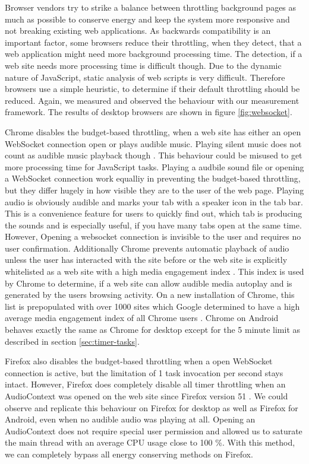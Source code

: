 \documentclass[
	ruledheaders=section,%
	class=report,%
	thesis={type=bachelor},%
	accentcolor=9c,%
	custommargins=true,%
	marginpar=false,%
	parskip=half-,%
	fontsize=11pt,%
]{tudapub}
\begin{document}
  Browser vendors try to strike a balance between throttling background pages as much as possible to conserve energy and keep the system more responsive and not breaking existing web applications. As backwards compatibility is an important factor, some browsers reduce their throttling, when they detect, that a web application might need more background processing time. The detection, if a web site needs more processing time is difficult though. Due to the dynamic nature of JavaScript, static analysis of web scripts is very difficult. Therefore browsers use a simple heuristic, to determine if their default throttling should be reduced. Again, we measured and observed the behaviour with our measurement framework. The results of desktop browsers are shown in figure \ref{fig:websocket}.

  Chrome disables the budget-based throttling, when a web site has either an open WebSocket connection open or plays audible music. Playing silent music does not count as audible music playback though \cite{chrome-background-tabs}. This behaviour could be misused to get more processing time for JavaScript tasks. Playing a audbile sound file or opening a WebSocket connection work equalliy in preventing the budget-based throttling, but they differ hugely in how visible they are to the user of the web page. Playing audio is obviously audible and marks your tab with a speaker icon in the tab bar. This is a convenience feature for users to quickly find out, which tab is producing the sounds and is especially useful, if you have many tabs open at the same time. However, Opening a websocket connection is invisible to the user and requires no user confirmation. Additionally Chrome prevents automatic playback of audio unless the user has interacted with the site before or the web site is explicitly whitelisted as a web site with a high media engagement index \cite{chrome-media-engagement-index}. This index is used by Chrome to determine, if a web site can allow audible media autoplay and is generated by the users browsing activity. On a new installation of Chrome, this list is prepopulated with over 1000 sites which Google determined to have a high average media engagement index of all Chrome users \cite{chrome-autoplay}. Chrome on Android behaves exactly the same as Chrome for desktop except for the 5 minute limit as described in section \ref{sec:timer-tasks}.

  Firefox also disables the budget-based throttling when a open WebSocket connection is active, but the limitation of 1 task invocation per second stays intact. However, Firefox does completely disable all timer throttling when an AudioContext was opened on the web site since Firefox version 51 \cite{firefox-audiocontext-exemption}. We could observe and replicate this behaviour on Firefox for desktop as well as Firefox for Android, even when no audible audio was playing at all. Opening an AudioContext does not require special user permission and allowed us to saturate the main thread with an average CPU usage close to 100 \%. With this method, we can completely bypass all energy conserving methods on Firefox.
\end{document}
